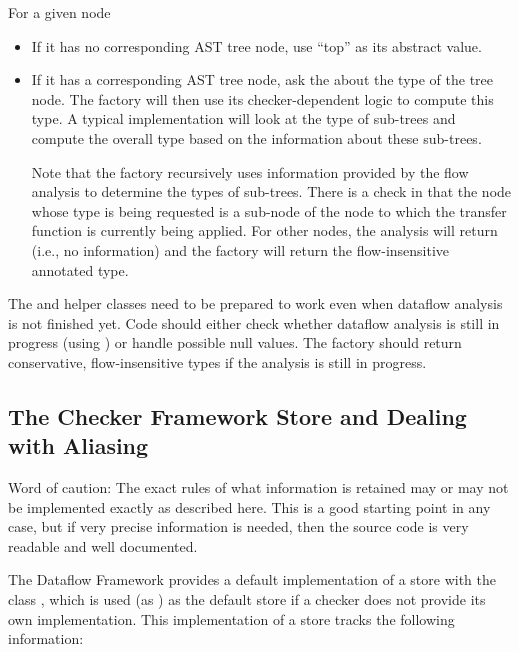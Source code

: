 For a given node 
\begin{itemize}
\item
    If it has no corresponding AST tree node, use ``top'' as its
    abstract value.
\item
    If it has a corresponding AST tree node, ask the
     about the type of the tree node.  The
    factory will then use its checker-dependent logic to compute this
    type.  A typical implementation will look at the type of sub-trees
    and compute the overall type based on the information about these
    sub-trees.

    Note that the factory recursively uses information provided by the
    flow analysis to determine the types of sub-trees.  There is a
    check in  that the node whose type is
    being requested is a sub-node of the node to which the transfer
    function is currently being applied.  For other nodes, the
    analysis will return  (i.e., no information) and the
    factory will return the flow-insensitive annotated type.

\end{itemize}

The  and helper classes need to be prepared to work
even when dataflow analysis is not finished yet. Code should either check
whether dataflow analysis is still in progress (using
) or handle possible null values. The factory should
return conservative, flow-insensitive types if the analysis is still in
progress.


\subsection{The Checker Framework Store and Dealing with Aliasing}

\begin{workinprogress}
    Word of caution: The exact rules of what information is
        retained may or may not be implemented exactly as described
        here.  This is a good starting point in any case, but if very
        precise information is needed, then the source code is very
        readable and well documented.
\end{workinprogress}

The Dataflow Framework provides a default implementation of a store
with the class , which is used (as
) as the default store if a checker does not provide its
own implementation.  This implementation of a store tracks the
following information:

